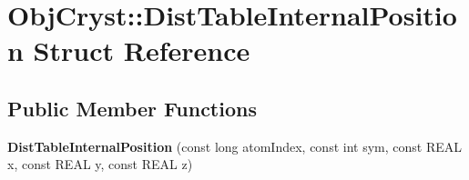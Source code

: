 \hypertarget{struct_obj_cryst_1_1_dist_table_internal_position}{}\section{Obj\+Cryst\+::Dist\+Table\+Internal\+Position Struct Reference}
\label{struct_obj_cryst_1_1_dist_table_internal_position}
\subsection*{Public Member Functions}
\begin{DoxyCompactItemize}
\item 
\mbox{\label{struct_obj_cryst_1_1_dist_table_internal_position_a2474495c02b5da508839c7b0b9617b9a}} 
{\bfseries Dist\+Table\+Internal\+Position} (const long atom\+Index, const int sym, const R\+E\+AL x, const R\+E\+AL y, const R\+E\+AL z)
\end{DoxyCompactItemize}

